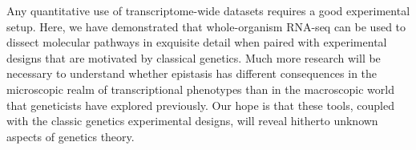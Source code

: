 \documentclass[9pt,twocolumn,twoside,lineno]{pnas-new}
\begin{document}
Any quantitative use of transcriptome-wide datasets requires a good experimental
setup. Here, we have demonstrated that whole-organism RNA-seq can be used to
dissect molecular pathways in exquisite detail when paired with experimental
designs that are motivated by classical genetics. Much more research will be
necessary to understand whether epistasis has different consequences in the
microscopic realm of transcriptional phenotypes than in the macroscopic world
that geneticists have explored previously. Our hope is that these tools, coupled
with the classic genetics experimental  designs, will reveal hitherto unknown
aspects of genetics theory.


%

%
%
%
%
%
\end{document}
